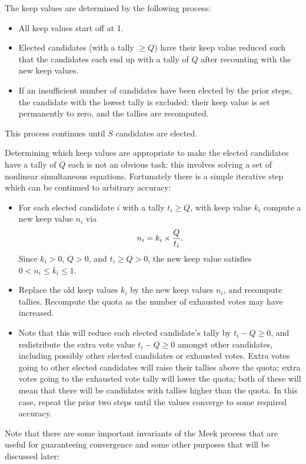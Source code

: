 \documentclass{article}
\begin{document}
The keep values are determined by the following process:
\begin{itemize}
    \item All keep values start off at 1.
    \item Elected candidates (with a tally $\geq Q$) have their keep value reduced such that the candidates each end up with a tally of $Q$ after recounting with the new keep values.
    \item If an insufficient number of candidates have been elected by the prior steps,
    the candidate with the lowest tally is excluded: their keep value is set permanently
    to zero, and the tallies are recomputed.
\end{itemize}
This process continues until $S$ candidates are elected.

Determining which keep values are appropriate to make the elected candidates have a tally
of $Q$ each is not an obvious task: this involves solving a set of nonlinear
simultaneous equations. Fortunately there is a simple iterative step which
can be continued to arbitrary accuracy:
\begin{itemize}
    \item For each elected candidate $i$ with a tally $t_i\geq Q$, with keep value $k_i$ compute
    a new keep value $n_i$ via \begin{equation}\label{eq:new_keep_value}
        n_i = k_i \times {Q\over t_i}.
    \end{equation}Since $k_i>0$, $Q>0$, and $t_i\geq Q>0$, the new keep value satisfies $0<n_i\leq k_i\leq 1$.
    \item Replace the old keep values $k_i$ by the new keep values $n_i$, and recompute
    tallies. Recompute the quota as the number of exhausted votes may have increased.
    \item Note that this will reduce each elected candidate's tally by $t_i-Q\geq 0$,
    and redistribute the extra vote value $t_i-Q\geq 0$ amongst other candidates,
    including possibly other elected candidates or exhausted votes. Extra votes going
    to other elected candidates will raise their tallies above the quota; extra votes
    going to the exhausted vote tally will lower the quota; both of these will mean
    that there will be candidates with tallies higher than the quota. In this case,
    repeat the prior two steps until the values converge to some required accuracy.
\end{itemize}


Note that there are some important invariants of the Meek process that are useful
for guaranteeing convergence and some other purposes that will be discussed later:
\newenvironment{invariant}[1][]{\refstepcounter{invariant}\par\medskip
   \noindent\textbf{Invariant \theinvariant. #1} \rmfamily}{\medskip}
\end{document}

